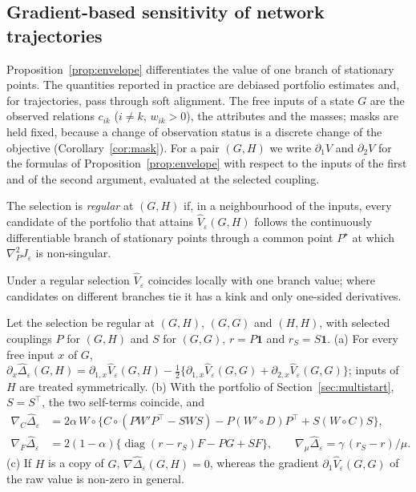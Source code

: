 \subsection{Gradient-based sensitivity of network trajectories}\label{sec:sensitivity}

Proposition~\ref{prop:envelope} differentiates the value of one branch of stationary points. The quantities reported in practice are debiased portfolio estimates and, for trajectories, pass through soft alignment. The free inputs of a state $G$ are the observed relations $c_{ik}$ ($i\neq k$, $w_{ik}>0$), the attributes and the masses; masks are held fixed, because a change of observation status is a discrete change of the objective (Corollary~\ref{cor:mask}). For a pair $(G,H)$ we write $\partial_1V$ and $\partial_2V$ for the formulas of Proposition~\ref{prop:envelope} with respect to the inputs of the first and of the second argument, evaluated at the selected coupling.

\begin{definition}\label{def:regular}
The selection is \emph{regular} at $(G,H)$ if, in a neighbourhood of the inputs, every candidate of the portfolio that attains $\widehat V_\varepsilon(G,H)$ follows the continuously differentiable branch of stationary points through a common point $P^\star$ at which $\nabla_P^2J_\varepsilon$ is non-singular.
\end{definition}

Under a regular selection $\widehat V_\varepsilon$ coincides locally with one branch value; where candidates on different branches tie it has a kink and only one-sided derivatives.

\begin{proposition}\label{prop:graddelta}
Let the selection be regular at $(G,H)$, $(G,G)$ and $(H,H)$, with selected couplings $P$ for $(G,H)$ and $S$ for $(G,G)$, $r=P\mathbf 1$ and $r_S=S\mathbf 1$.
(a) For every free input $x$ of $G$,
$\partial_x\widehat\Delta_\varepsilon(G,H)=\partial_{1,x}\widehat V_\varepsilon(G,H)-\tfrac12\{\partial_{1,x}\widehat V_\varepsilon(G,G)+\partial_{2,x}\widehat V_\varepsilon(G,G)\}$; inputs of $H$ are treated symmetrically.
(b) With the portfolio of Section~\ref{sec:multistart}, $S=S^\top$, the two self-terms coincide, and
\begin{align*}
\nabla_C\widehat\Delta_\varepsilon&=2\alpha\,W\circ\{C\circ(PW'P^\top-SWS)-P(W'\circ D)P^\top+S(W\circ C)S\},\\
\nabla_F\widehat\Delta_\varepsilon&=2(1-\alpha)\{\operatorname{diag}(r-r_S)F-PG+SF\},\qquad
\nabla_\mu\widehat\Delta_\varepsilon=\gamma\,(r_S-r)/\mu .
\end{align*}
(c) If $H$ is a copy of $G$, $\nabla\widehat\Delta_\varepsilon(G,H)=0$, whereas the gradient $\partial_1\widehat V_\varepsilon(G,G)$ of the raw value is non-zero in general.
\end{proposition}

